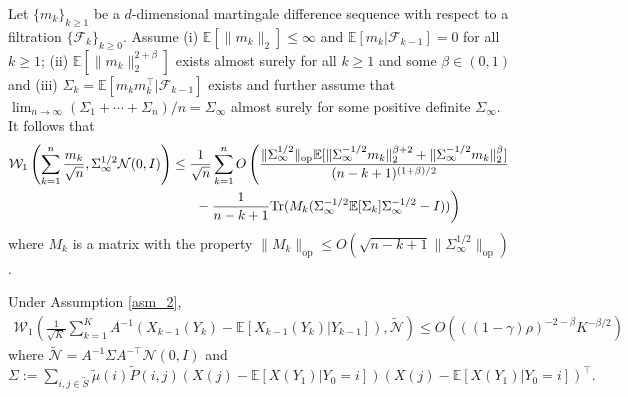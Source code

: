\documentclass{opt2025} %
\begin{document}
\begin{theorem}
\label{thm_mclt}
Let $\{ m_k \}_{k\geq 1}$ be a $d$-dimensional martingale difference sequence with respect to a filtration $\{ \mathcal{F}_k \}_{k\geq 0}$. Assume (i) $\mathbb{E}[\|m_k\|_2] \leq \infty$ and $\mathbb{E}[m_k|\mathcal{F}_{k-1}]=0$ for all $k \geq 1$; (ii) $\mathbb{E}[\| m_k\|_2^{2+\beta}]$ exists almost surely for all $k \geq 1$ and some $\beta \in (0,1)$ and (iii) $\Sigma_{k}= \mathbb{E}[m_k m_k^{\top}|\mathcal{F}_{k-1}]$ exists and further assume that $\lim_{n\rightarrow \infty} (\Sigma_1+\cdots+\Sigma_{n})/n = \Sigma_{\infty}$ almost surely for some positive definite $\Sigma_{\infty}$. It follows that
\begin{align*}
\mathcal{W}_1\left( \sum_{k=1}^n \frac{m_k}{\sqrt{n}} , \Sigma_{\infty}^{1/2}\mathcal{N}(0,I)\right) &\leq \frac{1}{\sqrt{n}} \sum_{k=1}^n O\left( \frac{\|\Sigma_{\infty}^{1/2}\|_{\mathrm{op}}\mathbb{E}[\|\Sigma_{\infty}^{-1/2} m_k \|_2^{\beta+2} + \| \Sigma_{\infty}^{-1/2} m_k \|_2^{\beta}]}{(n-k+1)^{(1+\beta)/2}} \right. \\
&\left. \indent - \frac{1}{n-k+1} \mathrm{Tr}(M_k(\Sigma_{\infty}^{-1/2}\mathbb{E}[\Sigma_k]\Sigma_{\infty}^{-1/2}-I)) \right)
\end{align*}
where $M_k$ is a matrix with the property $\|M_k\|_{\mathrm{op}} \leq O(\sqrt{n-k+1} \| \Sigma_{\infty}^{1/2} \|_{\mathrm{op}})$.
\end{theorem}

\begin{lemma}
\label{lem_mds}
Under Assumption \ref{asm_2},
\begin{align*}
\mathcal{W}_1 \left( \frac{1}{\sqrt{K}}\sum_{k=1}^{K} A^{-1}( X_{k-1}(Y_{k}) - \mathbb{E}[X_{k-1}(Y_{k})| Y_{k-1}]), \tilde{\mathcal{N}} \right) \leq O\left( ((1-\gamma)\rho)^{-2-\beta}K^{-\beta/2} \right)
\end{align*}
where $\tilde{\mathcal{N}} = A^{-1} \Sigma A^{-\top} \mathcal{N}(0,I)$ and $\Sigma := \sum_{i,j\in \tilde{S}} \tilde{\mu}(i)  \tilde{P}(i,j) (X(j) - \mathbb{E}[X(Y_1)|Y_0=i])(X(j) - \mathbb{E}[X(Y_1)|Y_0=i])^{\top}.$
\end{lemma}
\end{document}
